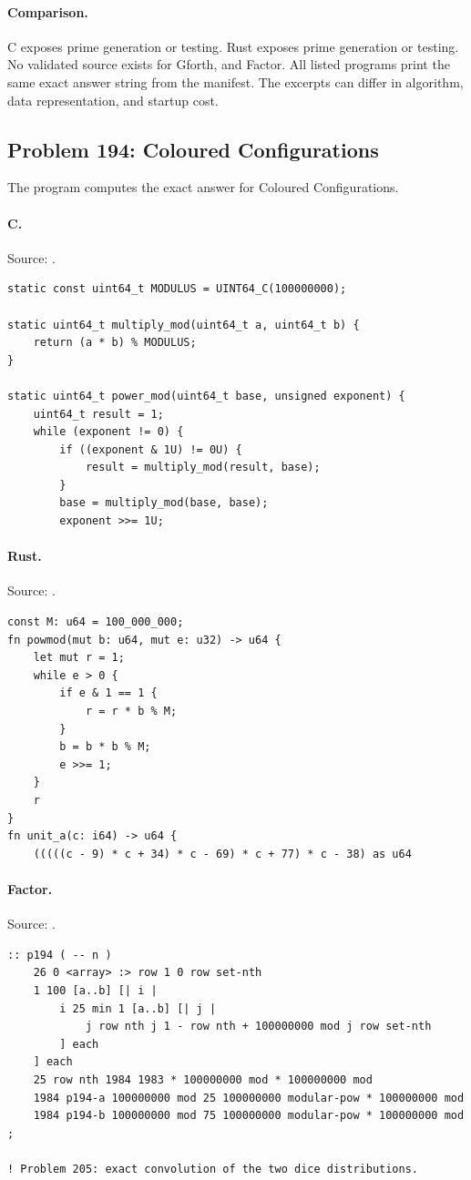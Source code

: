 \paragraph{Comparison.}
C exposes prime generation or testing. Rust exposes prime generation or testing.
No validated source exists for Gforth, and Factor.
All listed programs print the same exact answer string from the manifest. The excerpts can differ in algorithm, data representation, and startup cost.

\subsection{Problem 194: Coloured Configurations}
\label{walkthrough:p194}
The program computes the exact answer for Coloured Configurations.

\paragraph{C.} Source: .
\begin{lstlisting}
static const uint64_t MODULUS = UINT64_C(100000000);

static uint64_t multiply_mod(uint64_t a, uint64_t b) {
    return (a * b) % MODULUS;
}

static uint64_t power_mod(uint64_t base, unsigned exponent) {
    uint64_t result = 1;
    while (exponent != 0) {
        if ((exponent & 1U) != 0U) {
            result = multiply_mod(result, base);
        }
        base = multiply_mod(base, base);
        exponent >>= 1U;
\end{lstlisting}

\paragraph{Rust.} Source: .
\begin{lstlisting}
const M: u64 = 100_000_000;
fn powmod(mut b: u64, mut e: u32) -> u64 {
    let mut r = 1;
    while e > 0 {
        if e & 1 == 1 {
            r = r * b % M;
        }
        b = b * b % M;
        e >>= 1;
    }
    r
}
fn unit_a(c: i64) -> u64 {
    (((((c - 9) * c + 34) * c - 69) * c + 77) * c - 38) as u64
\end{lstlisting}

\paragraph{Factor.} Source: .
\begin{lstlisting}
:: p194 ( -- n )
    26 0 <array> :> row 1 0 row set-nth
    1 100 [a..b] [| i |
        i 25 min 1 [a..b] [| j |
            j row nth j 1 - row nth + 100000000 mod j row set-nth
        ] each
    ] each
    25 row nth 1984 1983 * 100000000 mod * 100000000 mod
    1984 p194-a 100000000 mod 25 100000000 modular-pow * 100000000 mod
    1984 p194-b 100000000 mod 75 100000000 modular-pow * 100000000 mod ;

! Problem 205: exact convolution of the two dice distributions.
\end{lstlisting}

